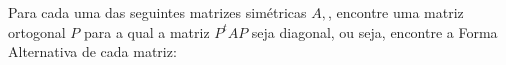 \documentclass[11pt,a4paper]{article}
\begin{document}
\begin{exercicio}
 
Para cada uma das seguintes matrizes simétricas $A,$, encontre uma matriz ortogonal $P$ para a qual a matriz $P^tAP$ seja diagonal, ou seja, encontre a Forma Alternativa de cada matriz:

\end{exercicio}
\end{document}
